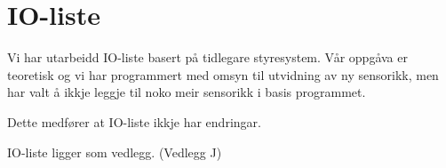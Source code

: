 \section{IO-liste}
\thispagestyle{fancy}

Vi har utarbeidd IO-liste basert på tidlegare styresystem. \newline
Vår oppgåva er teoretisk og vi har programmert med omsyn til utvidning av ny sensorikk, 
men har valt å ikkje leggje til noko meir sensorikk i basis programmet.

Dette medfører at \gls{IO}-liste ikkje har endringar.

\gls{IO}-liste ligger som vedlegg. (Vedlegg J)



%
%




